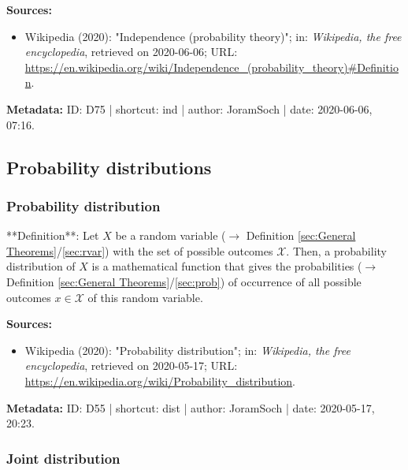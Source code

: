 \documentclass[a4paper,12pt,twoside]{book}
\begin{document}
\vspace{1em}
\textbf{Sources:}
\begin{itemize}
\item Wikipedia (2020): "Independence (probability theory)"; in: \textit{Wikipedia, the free encyclopedia}, retrieved on 2020-06-06; URL: \url{https://en.wikipedia.org/wiki/Independence_(probability_theory)#Definition}.
\end{itemize}


\vspace{1em}
\textbf{Metadata:} ID: D75 | shortcut: ind | author: JoramSoch | date: 2020-06-06, 07:16.
\vspace{1em}



\subsection{Probability distributions}

\subsubsection[\textit{Probability distribution}]{Probability distribution} \label{sec:dist}
\setcounter{equation}{0}

**Definition**: Let $X$ be a random variable ($\rightarrow$ Definition \ref{sec:General Theorems}/\ref{sec:rvar}) with the set of possible outcomes $\mathcal{X}$. Then, a probability distribution of $X$ is a mathematical function that gives the probabilities ($\rightarrow$ Definition \ref{sec:General Theorems}/\ref{sec:prob}) of occurrence of all possible outcomes $x \in \mathcal{X}$ of this random variable.


\vspace{1em}
\textbf{Sources:}
\begin{itemize}
\item Wikipedia (2020): "Probability distribution"; in: \textit{Wikipedia, the free encyclopedia}, retrieved on 2020-05-17; URL: \url{https://en.wikipedia.org/wiki/Probability_distribution}.
\end{itemize}


\vspace{1em}
\textbf{Metadata:} ID: D55 | shortcut: dist | author: JoramSoch | date: 2020-05-17, 20:23.
\vspace{1em}



\subsubsection[\textit{Joint distribution}]{Joint distribution} \label{sec:dist-joint}
\setcounter{equation}{0}
\end{document}
